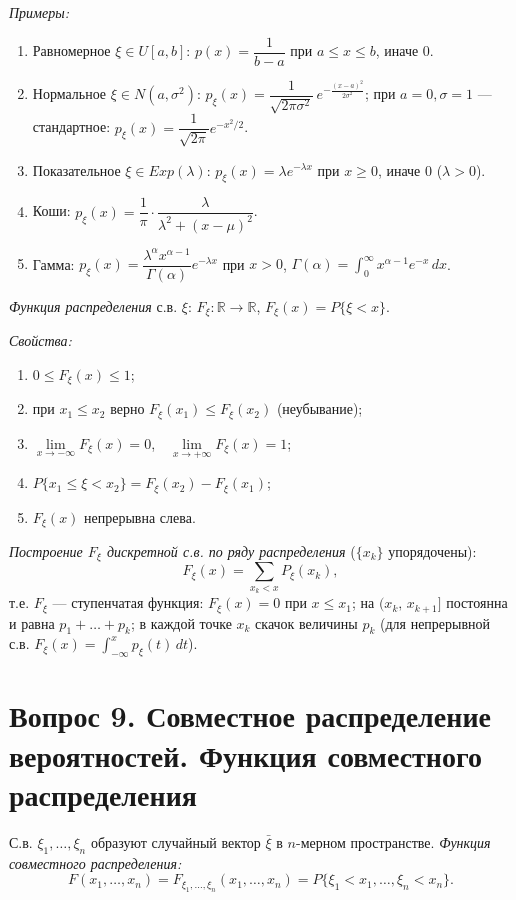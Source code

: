 \textit{Примеры:}
\begin{enumerate}
  \item Равномерное $\xi\in U[a,b]$: $p(x)=\dfrac1{b-a}$ при $a\le x\le b$, иначе $0$.
  \item Нормальное $\xi\in N(a,\sigma^2)$: $p_\xi(x)=\dfrac1{\sqrt{2\pi\sigma^2}}\,e^{-\frac{(x-a)^2}{2\sigma^2}}$; при $a=0,\sigma=1$ — стандартное: $p_\xi(x)=\dfrac1{\sqrt{2\pi}}e^{-x^2/2}$.
  \item Показательное $\xi\in Exp(\lambda)$: $p_\xi(x)=\lambda e^{-\lambda x}$ при $x\ge0$, иначе $0$ ($\lambda>0$).
  \item Коши: $p_\xi(x)=\dfrac1\pi\cdot\dfrac{\lambda}{\lambda^2+(x-\mu)^2}$.
  \item Гамма: $p_\xi(x)=\dfrac{\lambda^\alpha x^{\alpha-1}}{\Gamma(\alpha)}e^{-\lambda x}$ при $x>0$, $\Gamma(\alpha)=\int_0^\infty x^{\alpha-1}e^{-x}\,dx$.
\end{enumerate}

\textit{Функция распределения} с.в. $\xi$: $F_\xi\colon\mathbb{R}\to\mathbb{R}$, $F_\xi(x)=P\{\xi<x\}$.

\textit{Свойства:}
\begin{enumerate}
  \item $0\le F_\xi(x)\le1$;
  \item при $x_1\le x_2$ верно $F_\xi(x_1)\le F_\xi(x_2)$ (неубывание);
  \item $\lim\limits_{x\to-\infty}F_\xi(x)=0$,\ \ $\lim\limits_{x\to+\infty}F_\xi(x)=1$;
  \item $P\{x_1\le\xi<x_2\}=F_\xi(x_2)-F_\xi(x_1)$;
  \item $F_\xi(x)$ непрерывна слева.
\end{enumerate}

\textit{Построение $F_\xi$ дискретной с.в. по ряду распределения} ($\{x_k\}$ упорядочены):
\[ F_\xi(x)=\sum_{x_k<x}P_\xi(x_k), \]
т.е. $F_\xi$ — ступенчатая функция: $F_\xi(x)=0$ при $x\le x_1$; на $(x_k,\,x_{k+1}]$ постоянна и равна $p_1+\dots+p_k$; в каждой точке $x_k$ скачок величины $p_k$ (для непрерывной с.в. $F_\xi(x)=\int_{-\infty}^{x}p_\xi(t)\,dt$).

\section*{Вопрос 9. Совместное распределение вероятностей. Функция совместного распределения}

С.в. $\xi_1,\dots,\xi_n$ образуют случайный вектор $\bar\xi$ в $n$-мерном пространстве. \textit{Функция совместного распределения:}
\[ F(x_1,\dots,x_n)=F_{\xi_1,\dots,\xi_n}(x_1,\dots,x_n)=P\{\xi_1<x_1,\dots,\xi_n<x_n\}. \]

